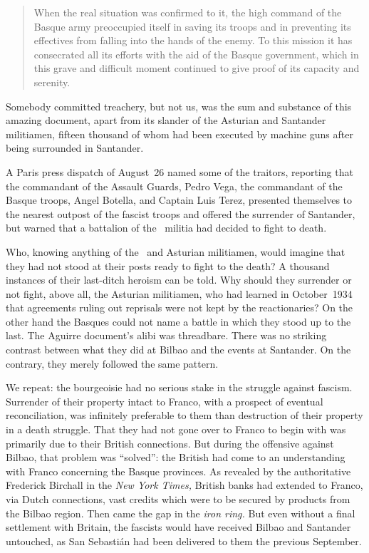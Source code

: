 \begin{quotation}
  When the real situation was confirmed to it, the high command of the Basque army preoccupied itself in saving its troops and in preventing its effectives from falling into the hands of the enemy. To this mission it has consecrated all its efforts with the aid of the Basque government, which in this grave and difficult moment continued to give proof of its capacity and serenity.%
\end{quotation}

Somebody committed treachery, but not us, was the sum and substance of this amazing document, apart from its slander of the Asturian and Santander militiamen, fifteen thousand of whom had been executed by machine guns after being surrounded in San\-tander.

A Paris press dispatch of August~26 named some of the traitors, reporting that the commandant of the Assault Guards, Pedro Vega, the commandant of the Basque troops, Angel Botella, and Captain Luis Terez, presented themselves to the nearest outpost of the fascist troops and offered the surrender of Santander, but warned that a battalion of the \FAI\ militia had decided to fight to death.

\begin{sloppypar}
  Who, knowing anything of the \CNT\ and Asturian militiamen, would imagine that they had not stood at their posts ready to fight to the death? A thousand instances of their last-ditch heroism can be told. Why should they surrender or not fight, above all, the Asturian militiamen, who had learned in October~1934 that agreements ruling out reprisals were not kept by the reactionaries? On the other hand the Basques could not name a battle in which they stood up to the last. The Aguirre document’s alibi was threadbare. There was no striking contrast between what they did at Bilbao and the events at Santander. On the contrary, they merely followed the same pattern.
\end{sloppypar}

We repeat: the bourgeoisie had no serious stake in the struggle against fascism. Surrender of their property intact to Franco, with a prospect of eventual reconciliation, was infinitely preferable to them than destruction of their property in a death struggle. That they had not gone over to Franco to begin with was primarily due to their British connections. But during the offensive against Bilbao, that problem was ``solved'': the British had come to an understanding with Franco concerning the Basque provinces. As revealed by the authoritative Frederick Birchall in the \emph{New York Times,} British banks had extended to Franco, via Dutch connections, vast credits which were to be secured by products from the Bilbao region. Then came the gap in the \emph{iron ring.} But even without a final settlement with Britain, the fascists would have received Bilbao and Santander untouched, as San Sebasti\'an had been delivered to them the previous September.

